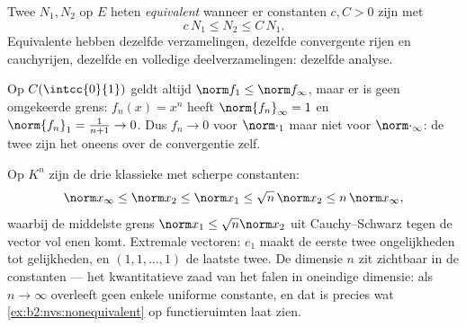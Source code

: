 \begin{definition}\label{def:b2:nvs:equivalent}
Twee  $N_1, N_2$ op $E$ heten
\emph{equivalent} wanneer er
constanten $c, C > 0$ zijn met
\[
c\,N_1 \leq N_2 \leq C\, N_1 .
\]
Equivalente  hebben dezelfde  verzamelingen, dezelfde
convergente rijen en cauchyrijen, dezelfde  en volledige
deelverzamelingen: dezelfde analyse.
\end{definition}

\begin{example}\label{ex:b2:nvs:nonequivalent}
Op $C(\intcc{0}{1})$ geldt altijd $\norm f_1 \leq \norm f_\infty$,
maar er is geen omgekeerde grens: $f_n(x) = x^n$ heeft
$\norm{f_n}_\infty = 1$ en $\norm{f_n}_1 = \frac{1}{n+1} \to 0$.
Dus $f_n \to 0$ voor $\norm\cdot_1$ maar niet voor
$\norm\cdot_\infty$: de twee  zijn het oneens over de
convergentie zelf.
\end{example}

\begin{example}\label{ex:b2:nvs:constants}
Op $K^n$ zijn de drie klassieke   met scherpe
constanten:
\[
\norm x_\infty \leq \norm x_2 \leq \norm x_1
\leq \sqrt n\,\norm x_2 \leq n\,\norm x_\infty ,
\]
waarbij de middelste grens $\norm x_1 \leq \sqrt n\norm x_2$ uit
Cauchy--Schwarz tegen de vector vol enen komt. Extremale vectoren:
$e_1$ maakt de eerste twee ongelijkheden tot gelijkheden, en $(1,
1, \dots, 1)$ de laatste twee. De dimensie $n$ zit zichtbaar in de
constanten --- het kwantitatieve zaad van het falen in oneindige
dimensie: als $n \to \infty$ overleeft geen enkele uniforme
constante, en dat is precies wat
\cref{ex:b2:nvs:nonequivalent} op functieruimten laat zien.
\end{example}

